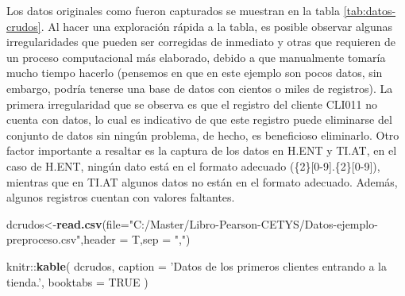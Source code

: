 \documentclass[]{book}
\newenvironment{Shaded}{\begin{snugshade}}{\end{snugshade}}
\newcommand{\KeywordTok}[1]{\textcolor[rgb]{0.13,0.29,0.53}{\textbf{{#1}}}}
\newcommand{\DataTypeTok}[1]{\textcolor[rgb]{0.13,0.29,0.53}{{#1}}}
\newcommand{\StringTok}[1]{\textcolor[rgb]{0.31,0.60,0.02}{{#1}}}
\newcommand{\OtherTok}[1]{\textcolor[rgb]{0.56,0.35,0.01}{{#1}}}
\newcommand{\NormalTok}[1]{{#1}}
\begin{document}
Los datos originales como fueron capturados se muestran en la tabla
\ref{tab:datos-crudos}. Al hacer una exploración rápida a la tabla, es
posible observar algunas irregularidades que pueden ser corregidas de
inmediato y otras que requieren de un proceso computacional más
elaborado, debido a que manualmente tomaría mucho tiempo hacerlo
(pensemos en que en este ejemplo son pocos datos, sin embargo, podría
tenerse una base de datos con cientos o miles de registros). La primera
irregularidad que se observa es que el registro del cliente CLI011 no
cuenta con datos, lo cual es indicativo de que este registro puede
eliminarse del conjunto de datos sin ningún problema, de hecho, es
beneficioso eliminarlo. Otro factor importante a resaltar es la captura
de los datos en H.ENT y TI.AT, en el caso de H.ENT, ningún dato está en
el formato adecuado (\{2\}{[}0-9{]}.\{2\}{[}0-9{]}), mientras que en
TI.AT algunos datos no están en el formato adecuado. Además, algunos
registros cuentan con valores faltantes.

\begin{Shaded}
\begin{Highlighting}[]
\NormalTok{dcrudos<-}\KeywordTok{read.csv}\NormalTok{(}\DataTypeTok{file=}\StringTok{"C:/Master/Libro-Pearson-CETYS/Datos-ejemplo-preproceso.csv"}\NormalTok{,}\DataTypeTok{header =} \NormalTok{T,}\DataTypeTok{sep =} \StringTok{","}\NormalTok{)}
\end{Highlighting}
\end{Shaded}

\begin{Shaded}
\begin{Highlighting}[]
\NormalTok{knitr::}\KeywordTok{kable}\NormalTok{(}
  \NormalTok{dcrudos, }\DataTypeTok{caption =} \StringTok{'Datos de los primeros clientes entrando a la tienda.'}\NormalTok{,}
  \DataTypeTok{booktabs =} \OtherTok{TRUE}
\NormalTok{)}
\end{Highlighting}
\end{Shaded}
\end{document}
